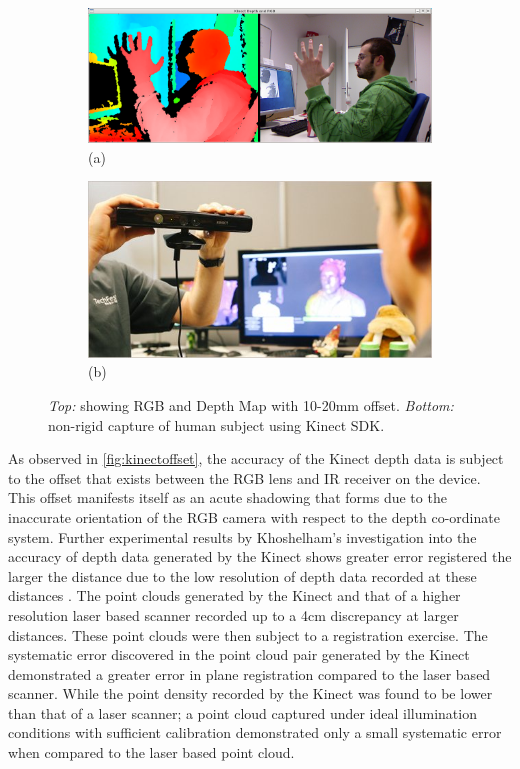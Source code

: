 \begin{figure}[ht]
\centering
        \begin{subfigure}
            \label{fig:kinectoffset}
            \centering
            \includegraphics[scale=0.15]{images/kinectoffset.png}
            (a)
            \end{subfigure}
            \begin{subfigure}
                \label{kinectrecon}
                \centering
                \includegraphics[scale=0.515]{images/kinectfusionrecon.jpg}
            (b)
        \end{subfigure}
        \caption{\emph{Top: }showing RGB and Depth Map with 10-20mm offset. \emph{Bottom: } non-rigid capture of human subject using Kinect SDK.}
\end{figure}

As observed in \ref{fig:kinectoffset}, the accuracy of the Kinect depth data is subject to the offset that exists between the RGB lens and IR receiver on the device. This offset manifests itself as an acute shadowing that forms due to the inaccurate orientation of the RGB camera with respect to the depth co-ordinate system. Further experimental results by Khoshelham's investigation \cite{Khoshelham2011} into the accuracy of depth data generated by the Kinect shows greater error registered the larger the distance due to the low resolution of depth data recorded at these distances \cite{Khoshelham2011}. The point clouds generated by the Kinect and that of a higher resolution laser based scanner recorded up to a  4cm discrepancy at larger distances. These point clouds were then subject to a registration exercise. The systematic error discovered in the point cloud pair generated by the Kinect demonstrated a greater error in plane registration compared to the laser based scanner. While the point density recorded by the Kinect was found to be lower than that of a laser scanner; a point cloud captured under ideal illumination conditions with sufficient calibration demonstrated only a small systematic error when compared to the laser based point cloud.

